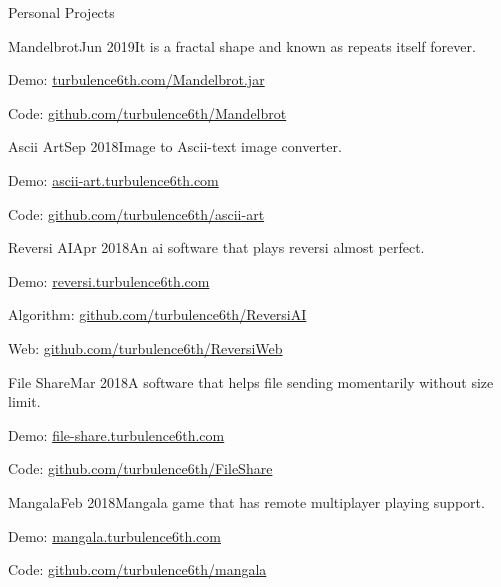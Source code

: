 \documentclass{resume} %
\begin{document}
\begin{rSection}{Personal Projects}

\begin{rSubsection}{Mandelbrot}{Jun 2019}{It is a fractal shape and known as repeats itself forever.}{}
\item Demo: \href{http://turbulence6th.com/Mandelbrot.jar}{turbulence6th.com/Mandelbrot.jar}
\item Code: \href{https://github.com/turbulence6th/Mandelbrot}{github.com/turbulence6th/Mandelbrot}
\end{rSubsection}

\begin{rSubsection}{Ascii Art}{Sep 2018}{Image to Ascii-text image converter.}{}
\item Demo: \href{http://ascii-art.turbulence6th.com}{ascii-art.turbulence6th.com}
\item Code: \href{https://github.com/turbulence6th/ascii-art}{github.com/turbulence6th/ascii-art}
\end{rSubsection}

\begin{rSubsection}{Reversi AI}{Apr 2018}{An ai software that plays reversi almost perfect.}{}
\item Demo: \href{http://reversi.turbulence6th.com}{reversi.turbulence6th.com}
\item Algorithm: \href{https://github.com/turbulence6th/ReversiAI}{github.com/turbulence6th/ReversiAI}
\item Web: \href{https://github.com/turbulence6th/ReversiWeb}{github.com/turbulence6th/ReversiWeb}
\end{rSubsection}

\begin{rSubsection}{File Share}{Mar 2018}{A software that helps file sending momentarily without size limit.}{}
\item Demo: \href{http://file-share.turbulence6th.com}{file-share.turbulence6th.com}
\item Code: \href{https://github.com/turbulence6th/FileShare}{github.com/turbulence6th/FileShare}
\end{rSubsection}

\begin{rSubsection}{Mangala}{Feb 2018}{Mangala game that has remote multiplayer playing support.}{}
\item Demo: \href{http://mangala.turbulence6th.com}{mangala.turbulence6th.com}
\item Code: \href{https://github.com/turbulence6th/mangala}{github.com/turbulence6th/mangala}
\end{rSubsection}

\end{rSection}
\end{document}
